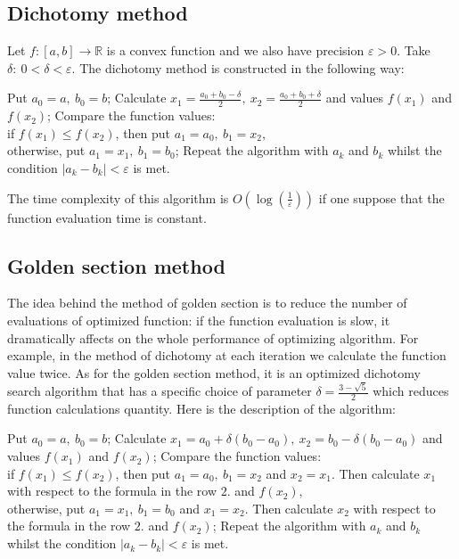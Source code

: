 \documentclass[12pt, bachelor, substylefile = algo_title.rtx]{disser}
\newcommand{\eps}{\varepsilon}
\theoremstyle{definition}
\begin{document}
\subsection{Dichotomy method}
Let $f: [a, b] \to \mathbb{R}$ is a convex function and we also have precision $\eps > 0$. Take $\delta:\ 0 < \delta < \eps$. The dichotomy method is constructed in the following way:
\begin{outline}[enumerate]
\1 Put $a_0 = a,\ b_0 = b$;
\1 Calculate $x_1 = \frac{a_0+b_0 - \delta}{2},\ x_2 = \frac{a_0+b_0 + \delta}{2}$ and values $f(x_1)$ and $f(x_2)$;
\1 Compare the function values:\\
  if $f(x_1) \le f(x_2)$, then put $a_1 = a_0,\ b_1 = x_2$,\\
	otherwise, put $a_1 = x_1,\ b_1 = b_0$;
\1 Repeat the algorithm with $a_k$ and $b_k$ whilst the condition $|a_k - b_k|<\eps$ is met.
\end{outline}

The time complexity of this algorithm is $O(\log(\frac{1}{\eps}))$ if one suppose that the function evaluation time is constant. 

\subsection{Golden section method}

The idea behind the method of golden section is to reduce the number of evaluations of optimized function: if the function evaluation is slow, it dramatically affects on the whole performance of optimizing algorithm. For example, in the method of dichotomy at each iteration we calculate the function value twice. As for the golden section method, it is an optimized dichotomy search algorithm that has a specific choice of parameter $\delta = \frac{3-\sqrt{5}}{2}$ which reduces function calculations quantity. Here is the description of the algorithm:
\begin{outline}[enumerate]
\1 Put $a_0 = a,\ b_0 = b$;
\1 Calculate $x_1 = a_0+\delta (b_0-a_0),\ x_2 = b_0-\delta (b_0-a_0)$ and values $f(x_1)$ and $f(x_2)$;
\1 Compare the function values:\\
 if $f(x_1) \le f(x_2)$, then put $a_1 = a_0,\ b_1 = x_2$ and $x_2 = x_1$. Then calculate $x_1$ with respect to the formula in the row $2.$ and $f(x_2)$,\\
	otherwise, put $a_1 = x_1,\ b_1 = b_0$ and $x_1 = x_2$. Then calculate $x_2$ with respect to the formula in the row $2.$ and $f(x_2)$;
\1 Repeat the algorithm with $a_k$ and $b_k$ whilst the condition $|a_k - b_k|<\eps$ is met.
\end{outline}
\end{document}
